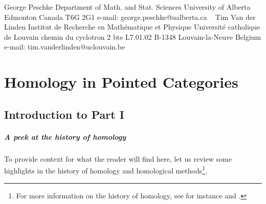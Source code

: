\documentclass [12pt,oneside]{book}%
\theoremstyle{captionstyle}  %
\begin{document}
\bigskip\bigskip\bigskip
{\footnotesize
    \begin{multicols}{2}\raggedright\makeatletter
        George Peschke\newline
        Department of Math. and Stat. Sciences\newline
        University of Alberta\newline
        Edmonton\newline
        Canada T6G 2G1\newline
        e-mail: george.peschke@ualberta.ca\newline
        {\ }\newline
        Tim Van der Linden\newline
        Institut de Recherche en Math{\'e}matique et Physique\newline
        Universit{\'e} catholique de Louvain\newline
        chemin du cyclotron 2 bte L7.01.02\newline
        B-1348 Louvain-la-Neuve\newline
        Belgium\newline
        e-mail: tim.vanderlinden@uclouvain.be
    \end{multicols}   }



\rhead{\bfseries\footnotesize%
}


\part[Homology in Pointed Categories]{Homology in Pointed Categories}
\label{part:Homology}%
%
\chapter*{Introduction to Part I}
\label{chap:IntroPart-I}%

\subsubsection*{A peek at the history of homology}
To provide context for what the reader will find here, let us review some highlights in the history of homology and homological methods\footnote{For more information on the history of homology, see for instance \cite{JDieudonne1989} and \cite{CAWeibel1994-HomAlg}.}.
\end{document}
